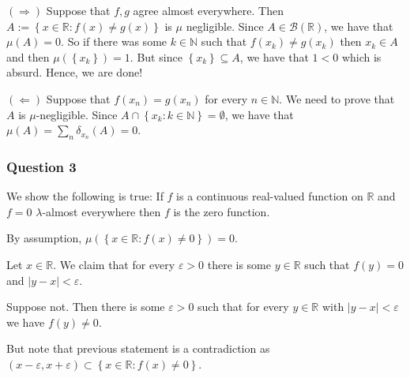 \documentclass[12pt]{article}
\theoremstyle{definition}
\theoremstyle{remark}
\theoremstyle{plain}
\newcommand{\R}{\mathbb R}
\newcommand{\N}{\mathbb N}
\newcommand{\scrB}{{\mathscr B}}
\begin{document}
$\left( \Longrightarrow \right)$ Suppose that $f,g$ agree almost everywhere. Then $A:=\left\{ x\in \R : f(x)\ne g(x) \right\}$ is $\mu$ negligible. Since $A \in \scrB (\R)$, we have that $\mu (A) =0$. So if there was some $k\in \N$ such that $f(x_k)\not =g(x_k)$ then $x_k\in A$ and then $\mu \left( \left\{ x_k \right\} \right) =1$. But since $\left\{ x_k \right\} \subseteq A$, we have that $1 < 0$ which is absurd. Hence, we are done!

$\left( \Longleftarrow \right)$ Suppose that $f(x_n ) = g(x_n)$ for every $n\in\N$. We need to prove that $A$ is $\mu$-negligible. Since $A \cap \left\{ x_k : k\in \N \right\} = \emptyset$, we have that $\mu (A) = \sum _n \delta _{x_n} \left( A \right) =0$.

\subsubsection{Question 3}
We show the following is true: If $f$ is a continuous real-valued function on $\R$ and $f=0$ $\lambda$-almost everywhere then $f$ is the zero function.

By assumption, $\mu\left( \left\{ x\in \R : f\left( x \right)\ne 0 \right\}\right) =0$.

Let $x\in \R$. We claim that for every $\varepsilon > 0$ there is some $y\in \R$ such that $f(y)=0$ and $|y-x|<\varepsilon$.

Suppose not. Then there is some $\varepsilon >0$ such that for every $y\in \R$ with $|y-x|<\varepsilon$ we have $f(y)\ne 0$.

But note that previous statement is a contradiction as $\left( x-\varepsilon, x+\varepsilon \right) \subset \left\{ x\in \R : f(x) \ne 0 \right\}$.
\end{document}
